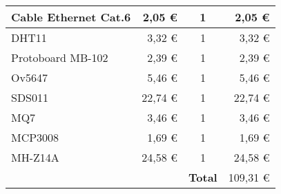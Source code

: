 \begin{table}[H]
\begin{tabular}{lrc|r|}
		\multicolumn{1}{|l|}{Cable   Ethernet Cat.6}                       & \multicolumn{1}{r|}{2,05 €}                                                          & 1                                   & 2,05 €                                                                               \\ \hline
		\multicolumn{1}{|l|}{DHT11}                                        & \multicolumn{1}{r|}{3,32 €}                                                          & 1                                   & 3,32 €                                                                               \\ \hline
		\multicolumn{1}{|l|}{Protoboard MB-102}                            & \multicolumn{1}{r|}{2,39 €}                                                          & 1                                   & 2,39 €                                                                               \\ \hline
		\multicolumn{1}{|l|}{Ov5647}                                       & \multicolumn{1}{r|}{5,46 €}                                                          & 1                                   & 5,46 €                                                                               \\ \hline
		\multicolumn{1}{|l|}{SDS011}                                       & \multicolumn{1}{r|}{22,74 €}                                                         & 1                                   & 22,74 €                                                                              \\ \hline
		\multicolumn{1}{|l|}{MQ7}                                          & \multicolumn{1}{r|}{3,46 €}                                                          & 1                                   & 3,46 €                                                                               \\ \hline
		\multicolumn{1}{|l|}{MCP3008}                                      & \multicolumn{1}{r|}{1,69 €}                                                          & 1                                   & 1,69 €                                                                               \\ \hline
		\multicolumn{1}{|l|}{MH-Z14A}                                      & \multicolumn{1}{r|}{24,58 €}                                                         & 1                                   & 24,58 €                                                                              \\ \hline
		\multicolumn{1}{r}{\textbf{}}                                      & \multicolumn{1}{l}{}                                                                 & \multicolumn{1}{r|}{\textbf{Total}} & 109,31 €                                                                             \\ \cline{4-4}
	\end{tabular}
\end{table}
\pagebreak

